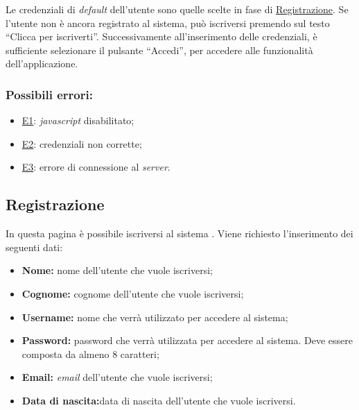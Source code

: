 Le credenziali di \textit{default} dell'utente sono quelle scelte in fase di \hyperref[Registrazione]{Registrazione}.
Se l'utente non è ancora registrato al sistema, può iscriversi premendo sul testo ``Clicca per iscriverti''.
Successivamente all'inserimento delle credenziali, è sufficiente selezionare il pulsante ``Accedi'', per accedere alle funzionalità dell'applicazione.

\subsubsection*{Possibili errori:}
\begin{itemize}
\item \hyperref[e1]{E1}: \textit{javascript} disabilitato;
\item \hyperref[e2]{E2}: credenziali non corrette;
\item \hyperref[e3]{E3}: errore di connessione al \textit{server}.
\end{itemize}

\subsection{Registrazione}
\label{registrazione}

In questa pagina è possibile iscriversi al sistema \progetto{}.
Viene richiesto l'inserimento dei seguenti dati:
\begin{itemize}
\item \textbf{Nome:} nome dell'utente che vuole iscriversi;
\item \textbf{Cognome:} cognome dell'utente che vuole iscriversi;
\item \textbf{Username:} nome che verrà utilizzato per accedere al sistema;
\item \textbf{Password:} password che verrà utilizzata per accedere al sistema. Deve essere composta da almeno 8 caratteri;
\item \textbf{Email:} \textit{email} dell'utente che vuole iscriversi;
\item \textbf{Data di nascita:}data di nascita dell'utente che vuole iscriversi.
\end{itemize}

